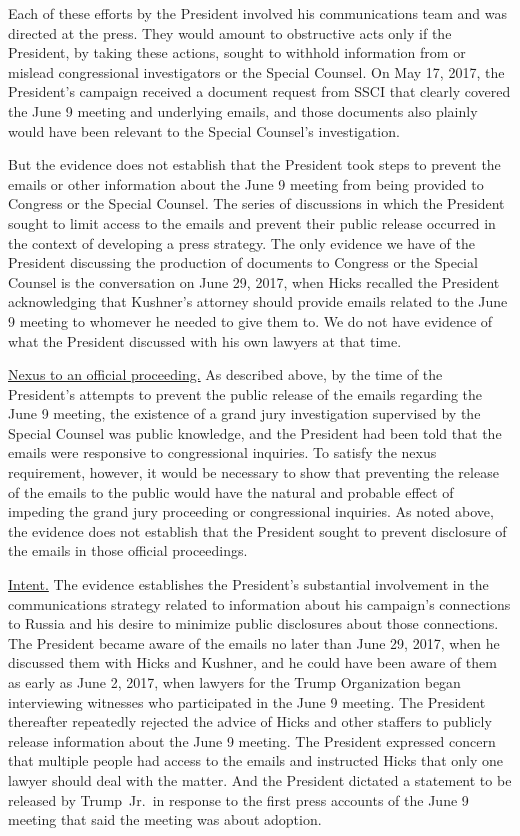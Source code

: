 {Each of these efforts by the President involved his communications team and was directed at the press.
They would amount to obstructive acts only if the President, by taking these actions, sought to withhold information from or mislead congressional investigators or the Special Counsel.
On May 17, 2017, the President's campaign received a document request from SSCI that clearly covered the June 9 meeting and underlying emails, and those documents also plainly would have been relevant to the Special Counsel's investigation.

But the evidence does not establish that the President took steps to prevent the emails or other information about the June 9 meeting from being provided to Congress or the Special Counsel.
The series of discussions in which the President sought to limit access to the emails and prevent their public release occurred in the context of developing a press strategy.
The only evidence we have of the President discussing the production of documents to Congress or the Special Counsel is the conversation on June 29, 2017, when Hicks recalled the President acknowledging that Kushner's attorney should provide emails related to the June 9 meeting to whomever he needed to give them to.
We do not have evidence of what the President discussed with his own lawyers at that time.

\underline{Nexus to an official proceeding.}
As described above, by the time of the President's attempts to prevent the public release of the emails regarding the June 9 meeting, the existence of a grand jury investigation supervised by the Special Counsel was public knowledge, and the President had been told that the emails were responsive to congressional inquiries.
To satisfy the nexus requirement, however, it would be necessary to show that preventing the release of the emails to the public would have the natural and probable effect of impeding the grand jury proceeding or congressional inquiries.
As noted above, the evidence does not establish that the President sought to prevent disclosure of the emails in those official proceedings.

\underline{Intent.}
The evidence establishes the President's substantial involvement in the communications strategy related to information about his campaign's connections to Russia and his desire to minimize public disclosures about those connections.
The President became aware of the emails no later than June 29, 2017, when he discussed them with Hicks and Kushner, and he could have been aware of them as early as June 2, 2017, when lawyers for the Trump Organization began interviewing witnesses who participated in the June 9 meeting.
The President thereafter repeatedly rejected the advice of Hicks and other staffers to publicly release information about the June 9 meeting.
The President expressed concern that multiple people had access to the emails and instructed Hicks that only one lawyer should deal with the matter.
And the President dictated a statement to be released by Trump~Jr.\ in response to the first press accounts of the June 9 meeting that said the meeting was about adoption.

}
